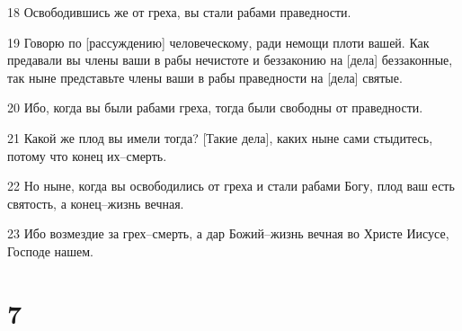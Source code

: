 \par 18 Освободившись же от греха, вы стали рабами праведности.
\par 19 Говорю по [рассуждению] человеческому, ради немощи плоти вашей. Как предавали вы члены ваши в рабы нечистоте и беззаконию на [дела] беззаконные, так ныне представьте члены ваши в рабы праведности на [дела] святые.
\par 20 Ибо, когда вы были рабами греха, тогда были свободны от праведности.
\par 21 Какой же плод вы имели тогда? [Такие дела], каких ныне сами стыдитесь, потому что конец их--смерть.
\par 22 Но ныне, когда вы освободились от греха и стали рабами Богу, плод ваш есть святость, а конец--жизнь вечная.
\par 23 Ибо возмездие за грех--смерть, а дар Божий--жизнь вечная во Христе Иисусе, Господе нашем.

\chapter{7}

